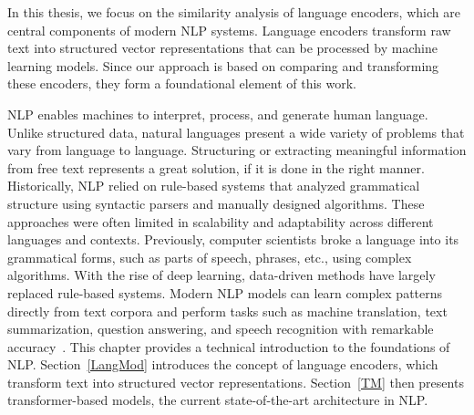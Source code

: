 In this thesis, we focus on the similarity analysis of language encoders, which are central components of modern \ac{NLP} systems. 
Language encoders transform raw text into structured vector representations that can be processed by machine learning models. 
Since our approach is based on comparing and transforming these encoders, they form a foundational element of this work.

\acf{NLP} enables machines to interpret, process, and generate human language. 
Unlike structured data, natural languages present a wide variety of problems that vary from language to language. 
Structuring or extracting meaningful information from free text represents a great solution, if it is done in the right manner.
Historically, \ac{NLP} relied on rule-based systems that analyzed grammatical structure using syntactic parsers and manually designed algorithms. 
These approaches were often limited in scalability and adaptability across different languages and contexts.
Previously, computer scientists broke a language into its grammatical forms, such as parts of speech, phrases, etc., using complex algorithms. 
With the rise of deep learning, data-driven methods have largely replaced rule-based systems.
Modern \ac{NLP} models can learn complex patterns directly from text corpora and perform tasks such as machine translation, text summarization, question answering, and speech recognition with remarkable accuracy~\cite{goyal_deep_2018}.
This chapter provides a technical introduction to the foundations of \ac{NLP}. Section~\ref{LangMod} introduces the concept of language encoders, which transform text into structured vector representations. 
Section~\ref{TM} then presents transformer-based models, the current state-of-the-art architecture in \ac{NLP}.
